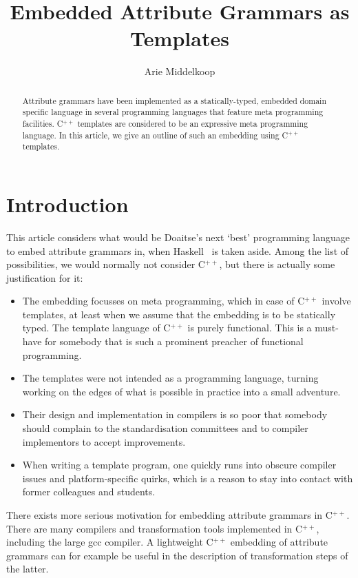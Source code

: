 \documentclass{llncs}
\title{Embedded Attribute Grammars as \Cpp{} Templates}
\author{Arie Middelkoop}
\institute{\email{amiddelk@gmail.com}}
\newcommand*{\Cpp}{C\ensuremath{^{++}}}
\begin{document}
  \maketitle

  \begin{abstract}
  Attribute grammars have been implemented as a statically-typed,
  embedded domain specific language
  in several programming languages that feature meta programming facilities.
  \Cpp{} templates are considered to be an expressive meta programming language.
  In this article, we give an outline of such an embedding using \Cpp{} templates.
  \end{abstract}
 
\section{Introduction}
\label{sec:introduction}

  This article considers what would be Doaitse's next `best' programming language 
  to embed attribute grammars in, when Haskell~\cite{DBLP:conf/sblp/VieraS12} is taken aside.
  Among the list of possibilities, we would normally not consider \Cpp, but
  there is actually some justification for it:
  \begin{itemize}
  \item The embedding focusses on meta programming, which in case of
    \Cpp{} involve templates, at least when we assume that the embedding
    is to be statically typed.
    The template language of \Cpp{} is purely functional. This is a must-have for
    somebody that is such a prominent preacher of functional programming.
  \item The templates were not intended as a programming language, turning
    working on the edges of what is possible in practice into a small
    adventure.
  \item
    Their design and implementation in compilers is so poor that somebody
    should complain to the standardisation committees and to compiler
    implementors to accept improvements.
  \item
    When writing a template program, one quickly runs into
    obscure compiler issues and platform-specific quirks, which is a
    reason to stay into contact with former colleagues and students.
  \end{itemize}
  There exists more serious motivation for embedding
  attribute grammars in \Cpp. There are many compilers
  and transformation tools implemented in \Cpp, including the
  large gcc compiler. A lightweight \Cpp{}
  embedding of attribute grammars can for example be useful in the
  description of transformation steps of the latter.
\end{document}
